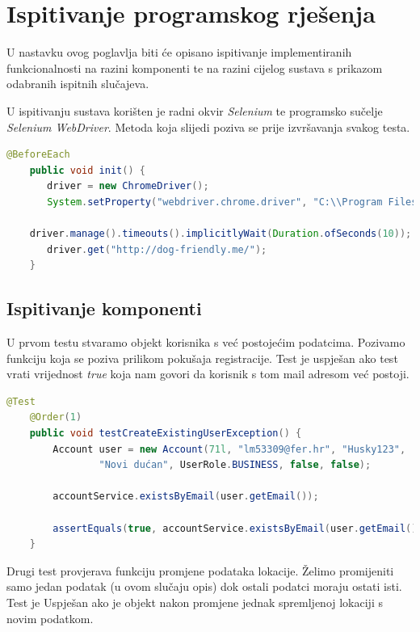     \section{Ispitivanje programskog rješenja}

    U nastavku ovog poglavlja biti će opisano ispitivanje implementiranih funkcionalnosti na razini komponenti te na razini cijelog sustava s prikazom odabranih ispitnih slučajeva.\newline
    
    U ispitivanju sustava korišten je radni okvir \textit{Selenium} te programsko sučelje \textit{Selenium WebDriver}. Metoda koja slijedi poziva se prije izvršavanja svakog testa.

    \begin{lstlisting}[language=Java,breaklines=true]
    @BeforeEach
	public void init() {
	   driver = new ChromeDriver();
	   System.setProperty("webdriver.chrome.driver", "C:\\Program Files (x86)\\Chrome Driver\\chromedriver.exe");
    
    driver.manage().timeouts().implicitlyWait(Duration.ofSeconds(10));
	   driver.get("http://dog-friendly.me/");
	}
    \end{lstlisting}

    \subsection{Ispitivanje komponenti}
    
    U prvom testu stvaramo objekt korisnika s već postojećim podatcima. Pozivamo funkciju koja se poziva prilikom pokušaja registracije. Test je uspješan ako test vrati vrijednost \textit{true} koja nam govori da korisnik s tom mail adresom već postoji.

    \begin{lstlisting}[language=Java,breaklines=true]
    @Test
    @Order(1)
    public void testCreateExistingUserException() {
        Account user = new Account(71l, "lm53309@fer.hr", "Husky123",
                "Novi dućan", UserRole.BUSINESS, false, false);

        accountService.existsByEmail(user.getEmail());

        assertEquals(true, accountService.existsByEmail(user.getEmail()));
    }
    \end{lstlisting}

    \eject
    Drugi test provjerava funkciju promjene podataka lokacije. Želimo promijeniti samo jedan podatak (u ovom slučaju opis) dok ostali podatci moraju ostati isti. Test je Uspješan ako je objekt nakon promjene jednak spremljenoj lokaciji s novim podatkom.

